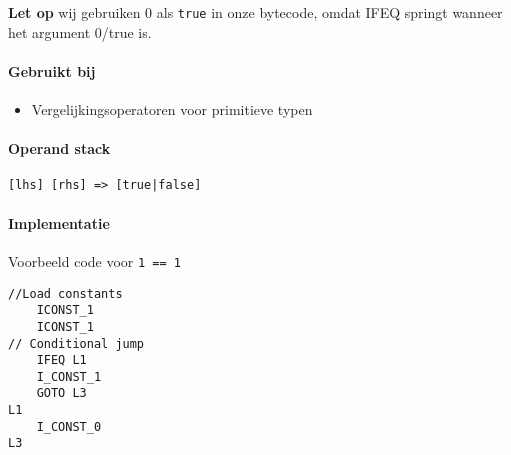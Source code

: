 \textbf{Let op} wij gebruiken 0 als \verb+true+ in onze bytecode, omdat IFEQ springt wanneer het argument 0/true is.

\paragraph{Gebruikt bij}
\begin{itemize}
	\item{Vergelijkingsoperatoren voor primitieve typen}
\end{itemize}

\paragraph{Operand stack}
\verb+[lhs] [rhs] => [true|false]+

\paragraph{Implementatie}
Voorbeeld code voor \verb+1 == 1+

\begin{verbatim}
//Load constants
	ICONST_1
	ICONST_1
// Conditional jump
	IFEQ L1
	I_CONST_1
	GOTO L3
L1
	I_CONST_0
L3
\end{verbatim}


